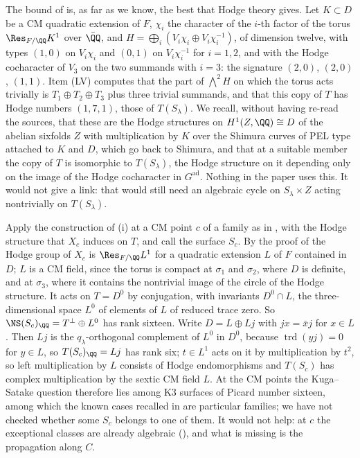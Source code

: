 \begin{remark}
\label{rem:mumfordunitary}
The bound of  is, as far as we know, the best that
Hodge theory gives. Let $K\subset D$ be a CM quadratic extension of $F$,
$\chi_{i}$ the character of the $i$-th factor of the torus
$\Res_{F/\QQ}K^{1}$ over $\bar{\QQ}$, and
$H=\bigoplus_{i}(V_{i}\chi_{i}\oplus V_{i}\chi_{i}^{-1})$, of dimension twelve,
with types $(1,0)$ on $V_{i}\chi_{i}$ and $(0,1)$ on $V_{i}\chi_{i}^{-1}$ for
$i=1,2$, and with the Hodge cocharacter of $V_{3}$ on the two summands with
$i=3$: the signature $(2,0)$, $(2,0)$, $(1,1)$. Item (LV) computes that the
part of $\bigwedge^{2}H$ on which the torus acts trivially is
$T_{1}\oplus T_{2}\oplus T_{3}$ plus three trivial summands, and that this
copy of $T$ has Hodge numbers $(1,7,1)$, those of $T(S_{\lambda})$. We recall,
without having re-read the sources, that these are the Hodge structures on
$H^{1}(Z,\QQ)\cong D$ of the abelian sixfolds $Z$ with multiplication by $K$
over the Shimura curves of PEL type attached to $K$ and $D$, which go back to
Shimura, and that at a suitable member the copy of $T$ is isomorphic to
$T(S_{\lambda})$, the Hodge structure on it depending only on the image of the
Hodge cocharacter in $G^{\mathrm{ad}}$. Nothing in the paper uses this. It
would not give a link: that would still need an algebraic cycle on
$S_{\lambda}\times Z$ acting nontrivially on $T(S_{\lambda})$.
\end{remark}

\begin{remark}\label{rem:mumfordkscm}
Apply the construction of (i) at a CM point $c$ of a
family as in , with the Hodge structure that
$X_{c}$ induces on $T$, and call the surface $S_{c}$. By the proof of
 the Hodge group of $X_{c}$ is $\Res_{F/\QQ}L^{1}$ for a
quadratic extension $L$ of $F$ contained in $D$; $L$ is a CM field, since the
torus is compact at $\sigma_{1}$ and $\sigma_{2}$, where $D$ is definite, and
at $\sigma_{3}$, where it contains the nontrivial image of the circle of the
Hodge structure. It acts on $T=D^{0}$ by conjugation, with invariants
$D^{0}\cap L$, the three-dimensional space $L^{0}$ of elements of $L$ of
reduced trace zero. So $\NS(S_{c})_{\QQ}=T^{\perp}\oplus L^{0}$ has rank
sixteen. Write $D=L\oplus Lj$ with $jx=\bar{x}j$ for $x\in L$. Then $Lj$ is
the $q_{\lambda}$-orthogonal complement of $L^{0}$ in $D^{0}$, because
$\operatorname{trd}(yj)=0$ for $y\in L$, so $T(S_{c})_{\QQ}=Lj$ has rank six;
$t\in L^{1}$ acts on it by multiplication by $t^{2}$, so left multiplication
by $L$ consists of Hodge endomorphisms and $T(S_{c})$ has complex
multiplication by the sextic CM field $L$. At the CM points the Kuga--Satake
question therefore lies among K3 surfaces of Picard number sixteen, among
which the known cases recalled in  are particular
families; we have not checked whether some $S_{c}$ belongs to one of them.
It would not help: at $c$ the exceptional classes are already algebraic
(), and what is missing is the propagation along $C$.
\end{remark}

